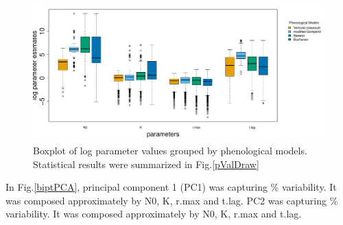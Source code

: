 \documentclass[a4paper, 11pt]{article}
\newcommand{\pms}{phenological models}
\begin{document}
 \begin{figure}[H]
	\centering
	\includegraphics[width=\linewidth]{../results/Log_boxPerFac.pdf}
	\caption{Boxplot of log parameter values grouped by \pms.  Statistical results were summarized in Fig.\ref{pValDraw}}
\end{figure}
 In Fig.\ref{biptPCA}, principal component 1 (PC1) was capturing 
 \% variability.  It was composed approximately by 
  N0, 
  K, 
  r.max and 
  t.lag.  PC2 was capturing 
  \% variability.  It was composed approximately by 
  N0, 
  K, 
  r.max and 
  t.lag.\\
 
\end{document}
